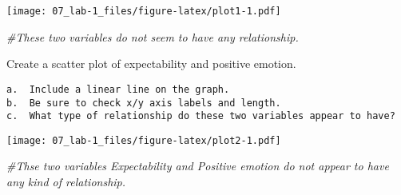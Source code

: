 \documentclass[
]{article}
\newenvironment{Shaded}{\begin{snugshade}}{\end{snugshade}}
\newcommand{\CommentTok}[1]{\textcolor[rgb]{0.56,0.35,0.01}{\textit{#1}}}
\newcommand{\DataTypeTok}[1]{\textcolor[rgb]{0.13,0.29,0.53}{#1}}
\newcommand{\KeywordTok}[1]{\textcolor[rgb]{0.13,0.29,0.53}{\textbf{#1}}}
\newcommand{\NormalTok}[1]{#1}
\newcommand{\OperatorTok}[1]{\textcolor[rgb]{0.81,0.36,0.00}{\textbf{#1}}}
\newcommand{\OtherTok}[1]{\textcolor[rgb]{0.56,0.35,0.01}{#1}}
\newcommand{\StringTok}[1]{\textcolor[rgb]{0.31,0.60,0.02}{#1}}
\begin{document}
\texttt{[image: 07\_lab-1\_files/figure-latex/plot1-1.pdf]}

\begin{Shaded}
\begin{Highlighting}[]
\CommentTok{#These two variables do not seem to have any relationship.}
\end{Highlighting}
\end{Shaded}

Create a scatter plot of expectability and positive emotion.

\begin{verbatim}
a.  Include a linear line on the graph. 
b.  Be sure to check x/y axis labels and length.
c.  What type of relationship do these two variables appear to have?
\end{verbatim}

\begin{Shaded}
\end{Shaded}

\texttt{[image: 07\_lab-1\_files/figure-latex/plot2-1.pdf]}

\begin{Shaded}
\begin{Highlighting}[]
\CommentTok{#Thse two variables Expectability and Positive emotion do not appear to have any kind of relationship.}
\end{Highlighting}
\end{Shaded}
\end{document}
